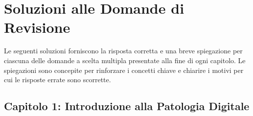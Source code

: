 
\chapter*{Soluzioni alle Domande di Revisione}
\label{ch:solutions}

Le seguenti soluzioni forniscono la risposta corretta e una breve spiegazione per ciascuna delle
domande a scelta multipla presentate alla fine di ogni capitolo. Le spiegazioni sono concepite
per rinforzare i concetti chiave e chiarire i motivi per cui le risposte errate sono scorrette.

\section*{Capitolo 1: Introduzione alla Patologia Digitale}

